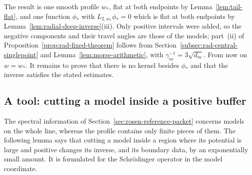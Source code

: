 The result is one smooth profile $w_*$, flat at both endpoints by
Lemma~\ref{lem:tail-flat}, and one function $\phi_*$ with
$L_{2,w_*}\phi_*=0$ which is flat at both endpoints by
Lemma~\ref{lem:radial-deep-inverse}(iii). Only positive intervals were
added, so the negative components and their travel angles are those of
the models; part~(ii) of Proposition~\ref{prop:rad-fixed-theorem}
follows from Section~\ref{subsec:rad-central-singlepoint} and
Lemma~\ref{lem:morse-arithmetic}, with $\gamma_m^{-1}=3\sqrt{d_m}$.
From now on $w=w_*$. It remains to prove that there is no kernel
besides $\phi_*$ and that the inverse satisfies the stated estimates.

\subsection{A tool: cutting a model inside a positive buffer}
\label{subsec:buffer}

The spectral information of Section~\ref{sec:rosen-reference-packet}
concerns models on the whole line, whereas the profile contains only
finite pieces of them. The following lemma says that cutting a model
inside a region where its potential is large and positive changes its
inverse, and its boundary data, by an exponentially small amount. It
is formulated for the Schr\"odinger operator in the model coordinate.

